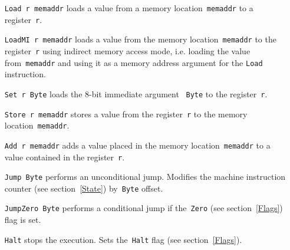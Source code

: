\begin{itemize}
    \item[\texttt{Load r memaddr}] loads a value from a memory location~\texttt{memaddr} to a register~\texttt{r}.

    \item[\texttt{LoadMI r memaddr}] loads a value from the memory location~\texttt{memaddr} to the register~\texttt{r} using indirect memory access mode, i.e. loading the value from~\texttt{memaddr} and using it as a memory address argument for the \texttt{Load} instruction.

    \item[\texttt{Set r Byte}] loads the 8-bit immediate argument ~\texttt{Byte} to the register~\texttt{r}.

    \item[\texttt{Store r memaddr}] stores a value from the register~\texttt{r} to the memory location~\texttt{memaddr}.

    \item[\texttt{Add r memaddr}] adds a value placed in the memory location~\texttt{memaddr} to a value contained in the register~\texttt{r}.

    \item[\texttt{Jump Byte}] performs an unconditional jump. Modifies the machine instruction counter (see section~\ref{State}) by~\texttt{Byte} offset.

    \item[\texttt{JumpZero Byte}] performs a conditional jump if the~\texttt{Zero} (see section~\ref{Flags}) flag is set.

    \item[\texttt{Halt}] stops the execution. Sets the~\texttt{Halt} flag (see section~\ref{Flags}).
\end{itemize}